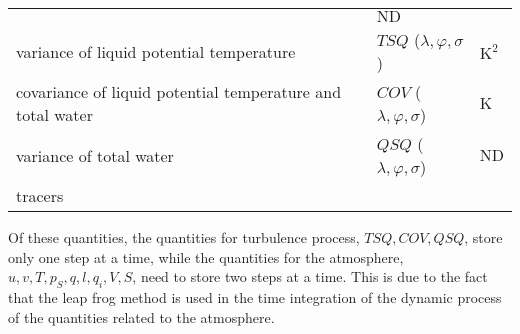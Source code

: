 \begin{longtable}[]{@{}lll@{}}
\begin{minipage}[t]{0.30\columnwidth}
\end{minipage} & \begin{minipage}[t]{0.30\columnwidth}\raggedright
\(\mathrm{ND}\)\strut
\end{minipage}\tabularnewline
\begin{minipage}[t]{0.30\columnwidth}\raggedright
variance of liquid potential temperature\strut
\end{minipage} & \begin{minipage}[t]{0.30\columnwidth}\raggedright
\(TSQ\) (\(\lambda,\varphi,\sigma\))\strut
\end{minipage} & \begin{minipage}[t]{0.30\columnwidth}\raggedright
\(\mathrm{K^2}\)\strut
\end{minipage}\tabularnewline
\begin{minipage}[t]{0.30\columnwidth}\raggedright
covariance of liquid potential temperature and total water\strut
\end{minipage} & \begin{minipage}[t]{0.30\columnwidth}\raggedright
\(COV\) (\(\lambda,\varphi,\sigma\))\strut
\end{minipage} & \begin{minipage}[t]{0.30\columnwidth}\raggedright
\(\mathrm{K}\)\strut
\end{minipage}\tabularnewline
\begin{minipage}[t]{0.30\columnwidth}\raggedright
variance of total water\strut
\end{minipage} & \begin{minipage}[t]{0.30\columnwidth}\raggedright
\(QSQ\) (\(\lambda,\varphi,\sigma\))\strut
\end{minipage} & \begin{minipage}[t]{0.30\columnwidth}\raggedright
\(\mathrm{ND}\)\strut
\end{minipage}\tabularnewline
\begin{minipage}[t]{0.30\columnwidth}\raggedright
tracers\strut
\end{minipage} & \begin{minipage}[t]{0.30\columnwidth}\raggedright
\strut
\end{minipage} & \begin{minipage}[t]{0.30\columnwidth}\raggedright
\strut
\end{minipage}\tabularnewline
\bottomrule
\end{longtable}

Of these quantities, the quantities for turbulence process,
\(TSQ, COV, QSQ\), store only one step at a time, while the quantities
for the atmosphere, \(u, v, T, p_S, q, l, q_i, V, S\), need to store two
steps at a time. This is due to the fact that the leap frog method is
used in the time integration of the dynamic process of the quantities
related to the atmosphere.

